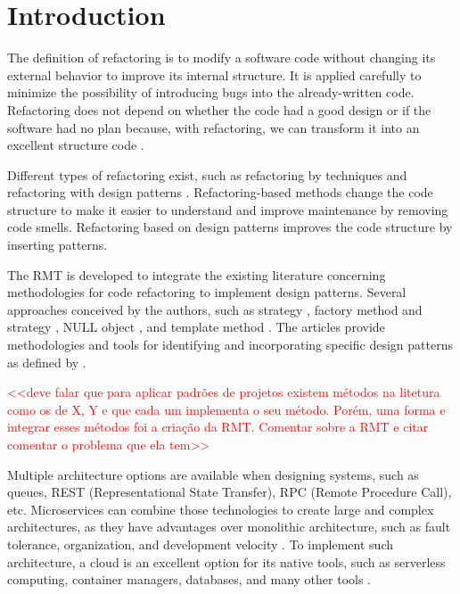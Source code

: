 \chapter{Introduction}%
\label{chpt-intro}

The definition of refactoring is to modify a software code without changing its external behavior to improve its internal structure. It is applied carefully to minimize the possibility of introducing bugs into the already-written code. Refactoring does not depend on whether the code had a good design or if the software had no plan because, with refactoring, we can transform it into an excellent structure code \cite{fowler2018refactoring}.

Different types of refactoring exist, such as refactoring by techniques \cite{fowler2018refactoring} and refactoring with design patterns \cite{kerievsky2005refactoring}. Refactoring-based methods change the code structure to make it easier to understand and improve maintenance by removing code smells. Refactoring based on design patterns improves the code structure by inserting patterns.

The RMT is developed to integrate the existing literature concerning methodologies for code refactoring to implement design patterns. Several approaches conceived by the authors, such as strategy \cite{CHRISTOPOULOU20121201}, factory method and strategy \cite{liu2014automated}, NULL object \cite{GAITANI201533}, and template method \cite{zafeiris2017automated}. The articles provide methodologies and tools for identifying and incorporating specific design patterns as defined by \textcite{Gamma2009}.

\textcolor{red}{<<deve falar que para aplicar padrões de projetos existem métodos na litetura como os de X, Y e que cada um implementa o seu método. Porém, uma forma e integrar esses métodos foi a criação da RMT. Comentar sobre a RMT e citar comentar o problema que ela tem>>}

Multiple architecture options are available when designing systems, such as queues, REST (Representational State Transfer), RPC (Remote Procedure Call), etc. Microservices can combine those technologies to create large and complex architectures, as they have advantages over monolithic architecture, such as fault tolerance, organization, and development velocity \cite{microservices-comuni}. To implement such architecture, a cloud is an excellent option for its native tools, such as serverless computing, container managers, databases, and many other tools \cite{balalaie2016}.

